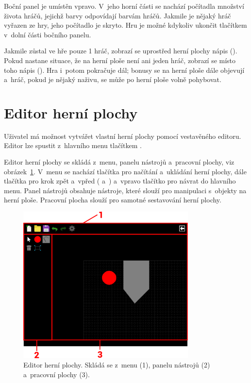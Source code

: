 Boční panel je umístěn vpravo. V~jeho horní části se nachází počítadla množství života hráčů, jejichž barvy odpovídají barvám hráčů. Jakmile je nějaký hráč vyřazen ze hry, jeho počítadlo je skryto. Hru je možné kdykoliv ukončit tlačítkem  v~dolní části bočního panelu.

Jakmile zůstal ve hře pouze 1 hráč, zobrazí se uprostřed herní plochy nápis  (). Pokud nastane situace, že na herní ploše není ani jeden hráč, zobrazí se místo toho nápis  (). Hra i~potom pokračuje dál; bonusy se na herní ploše dále objevují a~hráč, pokud je nějaký naživu, se může po herní ploše volně pohybovat.

\section{Editor herní plochy}
\label{sec:editor-herni-plochy}

Uživatel má možnost vytvářet vlastní herní plochy pomocí vestavěného editoru. Editor lze spustit z~hlavního menu tlačítkem .

Editor herní plochy se skládá z~menu, panelu nástrojů a~pracovní plochy, viz obrázek~\ref{fig:stage-editor}. V~menu se nachází tlačítka pro načítání a~ukládání herní plochy, dále tlačítka pro krok zpět a~vpřed ( a~) a~vpravo tlačítko pro návrat do hlavního menu. Panel nástrojů obsahuje nástroje, které slouží pro manipulaci s~objekty na herní ploše. Pracovní plocha slouží pro samotné sestavování herní plochy.

\begin{figure}[ht]
    \centering
    \includegraphics[width=0.8\textwidth]{obrazky-figures/stage-editor.pdf}
    \caption{Editor herní plochy. Skládá se z~menu (1), panelu nástrojů (2) a~pracovní plochy (3).}
    \label{fig:stage-editor}
\end{figure}

